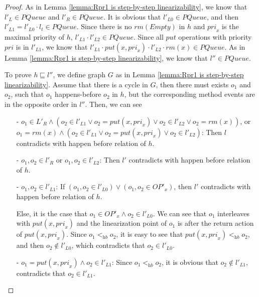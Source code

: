 \documentclass{llncs}
\begin{document}
\begin {proof}
As in Lemma \ref{lemma:Rpr1 is step-by-step linearizability}, we know that $l'_L \in \textit{PQueue}$ and $l'_R \in \textit{PQueue}$. It is obvious that $l'_{\textit{L0}} \in \textit{PQueue}$, and then $l'_{\textit{L1}} = l'_{\textit{L0}} \cdot l_t \in \textit{PQueue}$. Since there is no $\textit{rm}(\textit{Empty})$ in $h$ and $\textit{pri}_x$ is the maximal priority of $h$, $l'_{L1} \cdot l'_{L2} \in \textit{PQueue}$. Since all $\textit{put}$ operations with priority $\textit{pri}$ is in $l'_{L1}$, we know that $l'_{L1} \cdot \textit{put}(x,\textit{pri}_x) \cdot l'_{L2} \cdot \textit{rm}(x) \in \textit{PQueue}$. As in Lemma \ref{lemma:Rpr1 is step-by-step linearizability}, we know that $l'' \in \textit{PQueue}$.

To prove $h \sqsubseteq l''$, we define graph $G$ as in Lemma \ref{lemma:Rpr1 is step-by-step linearizability}. Assume that there is a cycle in $G$, then there must exists $o_1$ and $o_2$, such that $o_1$ happens-before $o_2$ in $h$, but the corresponding method events are in the opposite order in $l''$. Then, we can see

\begin{itemize}
\setlength{\itemsep}{0.5pt}

\item[-] $o_1 \in L'_R \wedge (o_2 \in l'_{L1} \vee o_2 = \textit{put}(x,\textit{pri}_x) \vee o_2 \in l'_{L2} \vee o_2 = \textit{rm}(x))$, or $o_1 = \textit{rm}(x) \wedge (o_2 \in l'_{L1} \vee o_2 = \textit{put}(x,\textit{pri}_x) \vee o_2 \in l'_{L2})$: Then $l$ contradicts with happen before relation of $h$.

\item[-] $o_1, o_2 \in l'_R$ or $o_1, o_2 \in l'_{L2}$: Then $l'$ contradicts with happen before relation of $h$.

\item[-] $o_1, o_2 \in l'_{L1}$: If $(o_1, o_2 \in l'_{L0}) \vee (o_1,o_2 \in \textit{OP}'_x)$, then $l'$ contradicts with happen before relation of $h$.

    Else, it is the case that $o_1 \in \textit{OP}'_x \wedge o_2 \in l'_{L0}$. We can see that $o_1$ interleaves with $\textit{put}(x,\textit{pri}_x)$ and the linearization point of $o_1$ is after the return action of $\textit{put}(x,\textit{pri}_x)$. Since $o_1 <_{\textit{hb}} o_2$, it is easy to see that $\textit{put}(x,\textit{pri}_x) <_{\textit{hb}} o_2$, and then $o_2 \notin l'_{L0}$, which contradicts that $o_2 \in l'_{L0}$.

\item[-] $o_1 = \textit{put}(x,\textit{pri}_x) \wedge o_2 \in l'_{L1}$: Since $o_1 <_{\textit{hb}} o_2$, it is obvious that $o_2 \notin l'_{L1}$, contradicts that $o_2 \in l'_{L1}$.


\end{itemize}
\end{proof}
\end{document}
